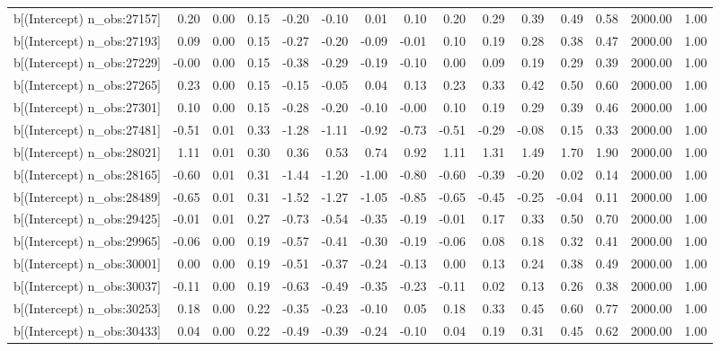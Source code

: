 \begin{table}[ht]
\begin{tabular}{rrrrrrrrrrrrrrr}
  b[(Intercept) n\_obs:27157] & 0.20 & 0.00 & 0.15 & -0.20 & -0.10 & 0.01 & 0.10 & 0.20 & 0.29 & 0.39 & 0.49 & 0.58 & 2000.00 & 1.00 \\ 
  b[(Intercept) n\_obs:27193] & 0.09 & 0.00 & 0.15 & -0.27 & -0.20 & -0.09 & -0.01 & 0.10 & 0.19 & 0.28 & 0.38 & 0.47 & 2000.00 & 1.00 \\ 
  b[(Intercept) n\_obs:27229] & -0.00 & 0.00 & 0.15 & -0.38 & -0.29 & -0.19 & -0.10 & 0.00 & 0.09 & 0.19 & 0.29 & 0.39 & 2000.00 & 1.00 \\ 
  b[(Intercept) n\_obs:27265] & 0.23 & 0.00 & 0.15 & -0.15 & -0.05 & 0.04 & 0.13 & 0.23 & 0.33 & 0.42 & 0.50 & 0.60 & 2000.00 & 1.00 \\ 
  b[(Intercept) n\_obs:27301] & 0.10 & 0.00 & 0.15 & -0.28 & -0.20 & -0.10 & -0.00 & 0.10 & 0.19 & 0.29 & 0.39 & 0.46 & 2000.00 & 1.00 \\ 
  b[(Intercept) n\_obs:27481] & -0.51 & 0.01 & 0.33 & -1.28 & -1.11 & -0.92 & -0.73 & -0.51 & -0.29 & -0.08 & 0.15 & 0.33 & 2000.00 & 1.00 \\ 
  b[(Intercept) n\_obs:28021] & 1.11 & 0.01 & 0.30 & 0.36 & 0.53 & 0.74 & 0.92 & 1.11 & 1.31 & 1.49 & 1.70 & 1.90 & 2000.00 & 1.00 \\ 
  b[(Intercept) n\_obs:28165] & -0.60 & 0.01 & 0.31 & -1.44 & -1.20 & -1.00 & -0.80 & -0.60 & -0.39 & -0.20 & 0.02 & 0.14 & 2000.00 & 1.00 \\ 
  b[(Intercept) n\_obs:28489] & -0.65 & 0.01 & 0.31 & -1.52 & -1.27 & -1.05 & -0.85 & -0.65 & -0.45 & -0.25 & -0.04 & 0.11 & 2000.00 & 1.00 \\ 
  b[(Intercept) n\_obs:29425] & -0.01 & 0.01 & 0.27 & -0.73 & -0.54 & -0.35 & -0.19 & -0.01 & 0.17 & 0.33 & 0.50 & 0.70 & 2000.00 & 1.00 \\ 
  b[(Intercept) n\_obs:29965] & -0.06 & 0.00 & 0.19 & -0.57 & -0.41 & -0.30 & -0.19 & -0.06 & 0.08 & 0.18 & 0.32 & 0.41 & 2000.00 & 1.00 \\ 
  b[(Intercept) n\_obs:30001] & 0.00 & 0.00 & 0.19 & -0.51 & -0.37 & -0.24 & -0.13 & 0.00 & 0.13 & 0.24 & 0.38 & 0.49 & 2000.00 & 1.00 \\ 
  b[(Intercept) n\_obs:30037] & -0.11 & 0.00 & 0.19 & -0.63 & -0.49 & -0.35 & -0.23 & -0.11 & 0.02 & 0.13 & 0.26 & 0.38 & 2000.00 & 1.00 \\ 
  b[(Intercept) n\_obs:30253] & 0.18 & 0.00 & 0.22 & -0.35 & -0.23 & -0.10 & 0.05 & 0.18 & 0.33 & 0.45 & 0.60 & 0.77 & 2000.00 & 1.00 \\ 
  b[(Intercept) n\_obs:30433] & 0.04 & 0.00 & 0.22 & -0.49 & -0.39 & -0.24 & -0.10 & 0.04 & 0.19 & 0.31 & 0.45 & 0.62 & 2000.00 & 1.00 \\ 

\end{tabular}
\end{table}
